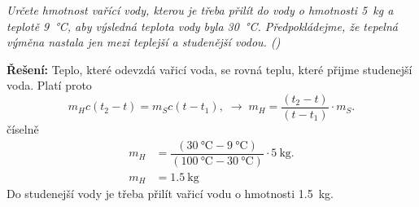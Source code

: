 \begin{mdframed}[style=mdexam]
  \begin{example}\label{FYZ:exam032}
    \emph{Určete hmotnost vařící vody, kterou je třeba přilít do vody o hmotnosti \qty{5}{\kg} a
    teplotě \qty{9}{\degreeCelsius}, aby výsledná teplota vody byla \qty{30}{\degreeCelsius}.
    Předpokládejme, že tepelná výměna nastala jen mezi teplejší a studenější vodou. 
     (\cite[s.~33]{Bartuska1997})}
    
    \textbf{Řešení:}\newline 
    Teplo, které odevzdá vařicí voda, se rovná teplu, které přijme studenejší voda. Platí proto
    \begin{equation*}
      m_Hc(t_2 - t) = m_Sc(t-t_1), \;\rightarrow\; m_H = \dfrac{(t_2 - t)}{(t-t_1)}\cdot m_S.
    \end{equation*}
    číselně
    \begin{align*}
      m_H &= \dfrac{(\qty{30}{\degreeCelsius}  -  \qty{9}{\degreeCelsius})}
                  {(\qty{100}{\degreeCelsius} - \qty{30}{\degreeCelsius})}\cdot\qty{5}{\kg}.         \\
      m_H &= \qty{1.5}{\kg}
    \end{align*}
    Do studenejší vody je třeba přilít vařicí vodu o hmotnosti \qty{1.5}{\kg}.  
  \end{example} 
\end{mdframed}